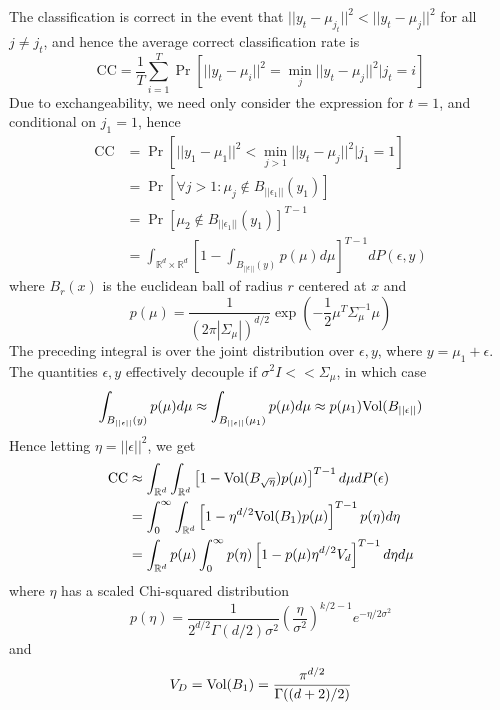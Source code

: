 \documentclass[11pt]{article}
\begin{document}
The classification is correct in the event that $||y_t - \mu_{j_t}||^2
< ||y_t - \mu_j||^2$ for all $j \neq j_t$, and hence the average correct classification rate is
\[
\text{CC} = \frac{1}{T}\sum_{i=1}^T \Pr[||y_t - \mu_i||^2 = \min_j ||y_t - \mu_j||^2 | j_t = i]
\]
Due to exchangeability, we need only consider the expression for $t = 1$, and conditional on $j_1 = 1$, hence
\begin{align*}
\text{CC} &= \Pr[||y_1 - \mu_1||^2 < \min_{j > 1} ||y_t - \mu_j||^2 | j_1 = 1]
\\&= \Pr[\forall j  > 1: \mu_j \notin B_{||\epsilon_1||}(y_1)]
\\&= \Pr[\mu_2 \notin B_{||\epsilon_1||}(y_1)]^{T - 1}
\\&= \int_{\mathbb{R}^d \times \mathbb{R}^d} \left[1 - \int_{B_{||\epsilon||}(y)} p(\mu) d\mu\right]^{T-1} dP(\epsilon, y)
\end{align*}
where $B_r(x)$ is the euclidean ball of radius $r$ centered at $x$ and
\[
p(\mu) = \frac{1}{(2\pi|\Sigma_\mu|)^{d/2}} \exp(-\frac{1}{2}\mu^T \Sigma_\mu^{-1} \mu)
\]
The preceding integral is over the joint distribution over $\epsilon, y$, where $y = \mu_1 + \epsilon$.  The quantities $\epsilon, y$ effectively decouple if $\sigma^2 I << \Sigma_\mu$, in which case
\[
\int_{B_{||\epsilon||}(y)} p(\mu) d\mu \approx \int_{B_{||\epsilon||}(\mu_1)} p(\mu) d\mu \approx p(\mu_1) \text{Vol}(B_{||\epsilon||})
\]
Hence letting $\eta  = ||\epsilon||^2$, we get
\begin{align*}
\text{CC} &\approx \int_{\mathbb{R}^d} \int_{\mathbb{R}^d} \left[1 - \text{Vol}(B_{\sqrt{\eta}}) p(\mu)\right]^{T-1} d\mu dP(\epsilon)
\\&= \int_0^\infty \int_{\mathbb{R}^d} \left[1 - \eta^{d/2} \text{Vol}(B_1) p(\mu)\right]^{T-1} p(\eta) d\eta
\\&= \int_{\mathbb{R}^d} p(\mu) \int_0^\infty  p(\eta) \left[1 - p(\mu) \eta^{d/2} V_d \right]^{T-1} d\eta d\mu
\end{align*}
where $\eta$ has a scaled Chi-squared distribution
\[
p(\eta) = \frac{1}{2^{d/2}\Gamma(d/2)\sigma^2} \left(\frac{\eta}{\sigma^2}\right)^{k/2 - 1} e^{-\eta/2\sigma^2}
\]
and
\[
V_D = \text{Vol}(B_1) = \frac{\pi^{d/2}}{\Gamma((d+2)/2)}
\]
\end{document}
